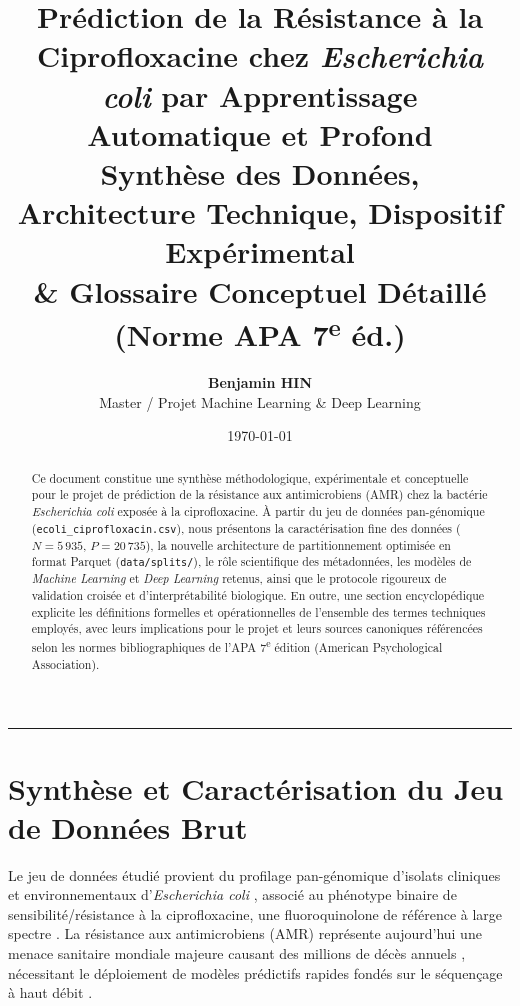 \documentclass[11pt,a4paper]{article}
\title{
    \vspace{-1.5cm}
    \textbf{\LARGE Prédiction de la Résistance à la Ciprofloxacine chez \textit{Escherichia coli} par Apprentissage Automatique et Profond}\\[0.3cm]
    \large Synthèse des Données, Architecture Technique, Dispositif Expérimental\\
    \& Glossaire Conceptuel Détaillé (Norme APA \texorpdfstring{7\textsuperscript{e}}{7e} éd.)
}
\author{\textbf{Benjamin HIN} \\ Master / Projet Machine Learning \& Deep Learning}
\date{\today}
\begin{document}
\maketitle

\begin{abstract}
Ce document constitue une synthèse méthodologique, expérimentale et conceptuelle pour le projet de prédiction de la résistance aux antimicrobiens (AMR) chez la bactérie \textit{Escherichia coli} exposée à la ciprofloxacine. À partir du jeu de données pan-génomique (\texttt{ecoli\_ciprofloxacin.csv}), nous présentons la caractérisation fine des données ($N=5\,935$, $P=20\,735$), la nouvelle architecture de partitionnement optimisée en format Parquet (\texttt{data/splits/}), le rôle scientifique des métadonnées, les modèles de \textit{Machine Learning} et \textit{Deep Learning} retenus, ainsi que le protocole rigoureux de validation croisée et d'interprétabilité biologique. En outre, une section encyclopédique explicite les définitions formelles et opérationnelles de l'ensemble des termes techniques employés, avec leurs implications pour le projet et leurs sources canoniques référencées selon les normes bibliographiques de l'APA 7\textsuperscript{e} édition (American Psychological Association).
\end{abstract}

\tableofcontents
\vspace{0.5cm}
\hrule
\vspace{0.5cm}

\section{Synthèse et Caractérisation du Jeu de Données Brut}

Le jeu de données étudié provient du profilage pan-génomique d'isolats cliniques et environnementaux d'\textit{Escherichia coli} \citep{tettelin2005genome,medini2005microbial}, associé au phénotype binaire de sensibilité/résistance à la ciprofloxacine, une fluoroquinolone de référence à large spectre \citep{aldred2014mechanism,hooper2015quinolone}. La résistance aux antimicrobiens (AMR) représente aujourd'hui une menace sanitaire mondiale majeure causant des millions de décès annuels \citep{murray2022global,who2024amr}, nécessitant le déploiement de modèles prédictifs rapides fondés sur le séquençage à haut débit \citep{anahtar2021applications,moradigaravand2018prediction}.
\end{document}
